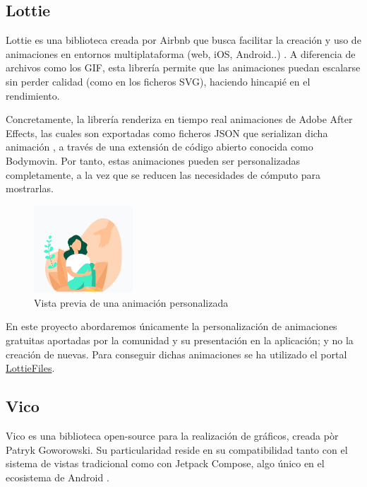         \subsection{Lottie}
            Lottie es una biblioteca creada por Airbnb que busca facilitar la creación y uso de animaciones en entornos
            multiplataforma (web, iOS, Android..) \cite{rubianes_lottie_2021}. A diferencia de archivos como los GIF, 
            esta librería permite que
            las animaciones puedan escalarse sin perder calidad (como en los ficheros SVG), haciendo hincapié en el
            rendimiento.

            Concretamente, la librería renderiza en tiempo real animaciones de Adobe After Effects, las cuales
            son exportadas como ficheros JSON que serializan dicha animación \cite{noauthor_lottie_nodate}, a través de
            una extensión de código abierto conocida como Bodymovin. Por tanto, 
            estas animaciones pueden
            ser personalizadas completamente, a la vez que se reducen las necesidades de cómputo para mostrarlas. 
            
            \begin{figure}[h]
                \centering
                \includegraphics[width=0.33\textwidth]{figures/Animacion de ejemplo.PNG}
                \caption{Vista previa de una animación personalizada}
                \label{figure:lottie:animacion_ejemplo}
            \end{figure}

            En este proyecto abordaremos únicamente la personalización de animaciones gratuitas aportadas por la 
            comunidad y su presentación en la aplicación; y no la creación de nuevas. Para conseguir dichas animaciones
            se ha utilizado el portal \href{https://lottiefiles.com/}{LottieFiles}.

        \subsection{Vico}
            
            Vico es una biblioteca open-source para la realización de gráficos, creada pòr Patryk Goworowski. Su 
            particularidad reside en su compatibilidad tanto con el sistema de vistas tradicional como con Jetpack
            Compose, algo único en el ecosistema de Android \cite{goworowski_vico_nodate}.

